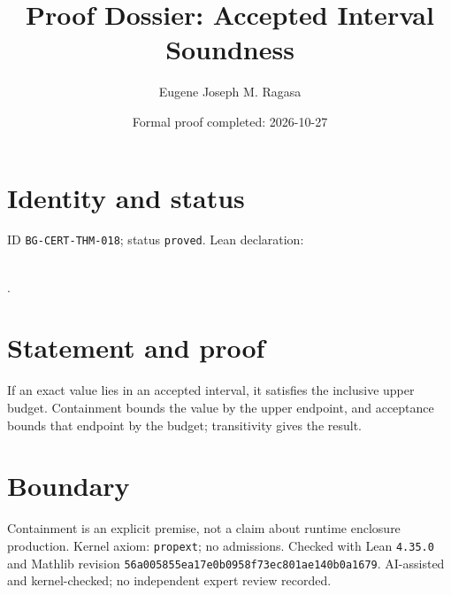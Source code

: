 \documentclass[11pt]{article}
\title{Proof Dossier: Accepted Interval Soundness}\author{Eugene Joseph M. Ragasa}\date{Formal proof completed: 2026-10-27}
\begin{document}
\maketitle
\section{Identity and status}
ID \texttt{BG-CERT-THM-018}; status \texttt{proved}. Lean declaration:
\par{}\\
{\tiny{}}.
\section{Statement and proof}
If an exact value lies in an accepted interval, it satisfies the inclusive upper budget.
Containment bounds the value by the upper endpoint, and acceptance bounds that endpoint by
the budget; transitivity gives the result.
\section{Boundary}
Containment is an explicit premise, not a claim about runtime enclosure production.
Kernel axiom: \texttt{propext}; no admissions. Checked with Lean \texttt{4.35.0} and
Mathlib revision \texttt{56a005855ea17e0b0958f73ec801ae140b0a1679}. AI-assisted and
kernel-checked; no independent expert review recorded.
\end{document}
